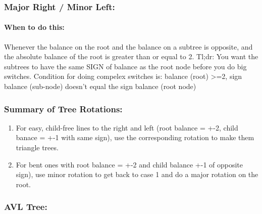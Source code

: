 \documentclass[a4paper,12pt]{article}
\begin{document}
\subsubsection{Major Right / Minor Left: }
\paragraph{When to do this: } Whenever the balance on the root and the balance on a subtree is opposite, and the absolute balance of the root is greater than or equal to 2. Tl;dr: You want the subtrees to have the same SIGN of balance as the root node before you do big switches. Condition for doing compelex switches is: balance (root) >=2, sign balance (sub-node) doesn't equal the sign balance (root node)

\subsubsection{Summary of Tree Rotations: }
\begin{enumerate}
\item For easy, child-free lines to the right and left (root balance = +-2, child banace = +-1 with same sign), use the corresponding rotation to make them triangle trees.
\item For bent ones with root balance = +-2 and child balance +-1 of opposite sign), use minor rotation to get back to case 1 and do a major rotation on the root. 
\end{enumerate}
\subsubsection{AVL Tree: }
\end{document}
